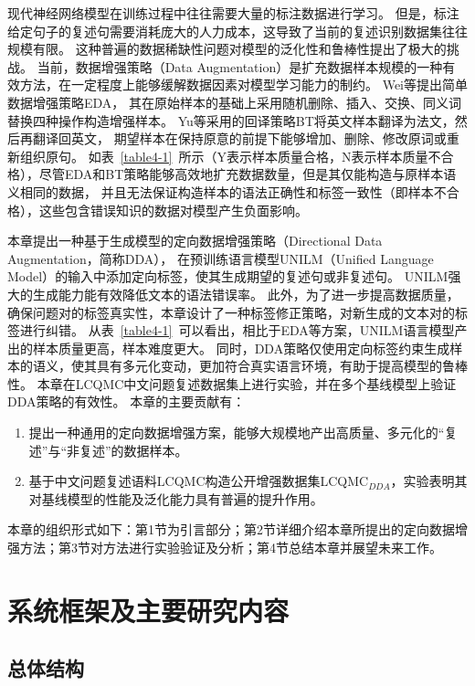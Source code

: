 现代神经网络模型在训练过程中往往需要大量的标注数据进行学习。
但是，标注给定句子的复述句需要消耗庞大的人力成本，这导致了当前的复述识别数据集往往规模有限。
这种普遍的数据稀缺性问题对模型的泛化性和鲁棒性提出了极大的挑战。
当前，数据增强策略（Data Augmentation）是扩充数据样本规模的一种有效方法，在一定程度上能够缓解数据因素对模型学习能力的制约。
Wei等提出简单数据增强策略EDA\cite{wei2019eda}，
其在原始样本的基础上采用随机删除、插入、交换、同义词替换四种操作构造增强样本。
Yu等采用的回译策略BT\cite{yu2018qanet}将英文样本翻译为法文，然后再翻译回英文，
期望样本在保持原意的前提下能够增加、删除、修改原词或重新组织原句。
如表~\ref{table4-1}~所示（Y表示样本质量合格，N表示样本质量不合格），尽管EDA和BT策略能够高效地扩充数据数量，但是其仅能构造与原样本语义相同的数据，
并且无法保证构造样本的语法正确性和标签一致性（即样本不合格），这些包含错误知识的数据对模型产生负面影响。

本章提出一种基于生成模型的定向数据增强策略（Directional Data Augmentation，简称DDA），
在预训练语言模型UNILM（Unified Language Model）\cite{bao2020unilmv2}的输入中添加定向标签，使其生成期望的复述句或非复述句。
UNILM强大的生成能力能有效降低文本的语法错误率。
此外，为了进一步提高数据质量，确保问题对的标签真实性，本章设计了一种标签修正策略，对新生成的文本对的标签进行纠错。
从表~\ref{table4-1}~可以看出，相比于EDA等方案，UNILM语言模型产出的样本质量更高，样本难度更大。
同时，DDA策略仅使用定向标签约束生成样本的语义，使其具有多元化变动，更加符合真实语言环境，有助于提高模型的鲁棒性。
本章在LCQMC\cite{liu2018lcqmc}中文问题复述数据集上进行实验，并在多个基线模型上验证DDA策略的有效性。
本章的主要贡献有：

\begin{enumerate}
    \item 
    提出一种通用的定向数据增强方案，能够大规模地产出高质量、多元化的“复述”与“非复述”的数据样本。
    \item 
    基于中文问题复述语料LCQMC构造公开增强数据集LCQMC$_{DDA}$，实验表明其对基线模型的性能及泛化能力具有普遍的提升作用。
\end{enumerate}

本章的组织形式如下：第1节为引言部分；第2节详细介绍本章所提出的定向数据增强方法；第3节对方法进行实验验证及分析；第4节总结本章并展望未来工作。


\section{系统框架及主要研究内容}

\subsection{总体结构}

